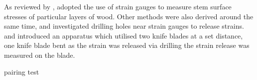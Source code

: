 As reviewed by \cite{kubler_1987}, \cite{Okuyama_1981} adopted the use of strain gauges to measure stem surface
stresses of particular layers of wood. Other methods were also derived around
the same time, \cite{gueneau1973}\cite{gueneau1973b} and \cite{kikata1977} investigated drilling holes near strain gauges to release strains.
\cite{Gueneau1974} and \cite{Saurat_1976} introduced an apparatus which utilised two knife
blades at a set distance, one knife blade bent as the strain was released via
drilling the strain release was measured on the blade. 

 \cite{Chauhan_2010} \cite{Entwistle_2014} pairing test